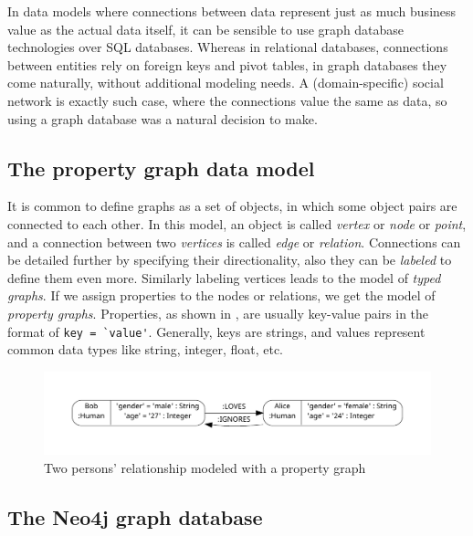 In data models where connections between data represent just as much business value as the actual data itself, it can be sensible to use graph database technologies over SQL databases. Whereas in relational databases, connections between entities rely on foreign keys and pivot tables, in graph databases they come naturally, without additional modeling needs. A (domain-specific) social network is exactly such case, where the connections value the same as data, so using a graph database was a natural decision to make.

\subsection{The property graph data model}

It is common to define graphs as a set of objects, in which some object pairs are connected to each other. In this model, an object is called \emph{vertex} or \emph{node} or \emph{point}, and a connection between two \emph{vertices} is called \emph{edge} or \emph{relation}. Connections can be detailed further by specifying their directionality, also they can be \emph{labeled} to define them even more. Similarly labeling vertices leads to the model of \emph{typed graphs}. If we assign properties to the nodes or relations, we get the model of \emph{property graphs}. Properties, as shown in , are usually key-value pairs in the format of \lstinline{key = `value'}. Generally, keys are strings, and values represent common data types like string, integer, float, etc.

\begin{figure}[!htb]
    \centering
    \includegraphics[width=\textwidth, trim=12mm 12mm 12mm 12mm,clip]{figures/property-graph.pdf}
    \caption{Two persons' relationship modeled with a property graph}
    \label{fig:property-graph}
\end{figure}

\subsection{The Neo4j graph database}
\label{subsection:preliminaryneo4j}

